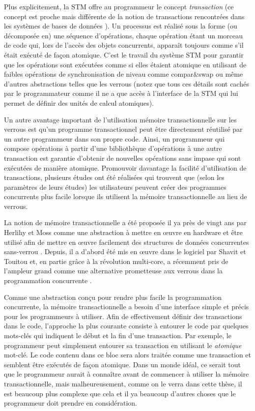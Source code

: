 Plus explicitement, la STM offre au programmeur le concept {\it transaction} (ce concept est proche mais différente
de la notion de transactions rencontrées dans les systèmes de bases de données \cite{FFGH08, HCUAGSV07, HL08}).
Un processus est réalisé sous la forme (ou décomposée en) une séquence d'opérations,
chaque opération étant un morceau de code qui, lors de l'accès des objets concurrents, apparaît toujours comme s'il était exécuté de façon atomique.
C'est le travail du système STM pour garantir que les opérations sont exécutées comme
si elles étaient atomique en utilisant de faibles opérations de synchronisation de niveau comme compar\&swap ou même d'autres
abstractions telles que les verrous (notez que tous ces détails sont cachés par le programmateur
comme il ne a que accès à l'interface de la STM qui lui permet de définir des unités de calcul atomiques).


Un autre avantage important de l'utilisation mémoire transactionnelle sur les verrous est 
qu'un programme transactionnel peut être directement réutilisé par un autre programmeur dans son propre code.
Ainsi, un programmeur qui compose opérations à partir d'une bibliothèque d'opérations à une 
autre transaction est garantie d'obtenir de nouvelles opérations sans impase qui sont exécutées de manière atomique.
Promouvoir davantage la facilité d'utilisation de transactions, plusieurs études \cite{PA11, RHW10} ont été réalisées qui
trouvent que (selon les paramètres de leurs études) les utilisateurs peuvent créer des programmes concurrents plus facile 
lorsque ils utilisent la mémoire transactionnelle au lieu de verrous.


La notion de mémoire transactionnelle a été proposée il ya près de vingt ans par Herlihy et Moss comme une abstraction à mettre
en œuvre en hardware et être utilisé afin de mettre en œuvre facilement des structures de données concurrentes sans-verrou \cite{HM93}.
Depuis, il a d'abord été mis en œuvre dans le logiciel par Shavit et Touitou \cite{ST97} et, en partie grâce à la
révolution multi-core, a récemment pris de l'ampleur grand comme une alternative prometteuse aux verrous dans la programmation concurrente \cite{FFGH08,HCUAGSV07,LK08,R08}.


Comme une abstraction conçu pour rendre plus facile la programmation concurrente, la mémoire transactionnelle a
besoin d'une interface simple et précis pour les programmeurs à utiliser.
Afin de effectivement définir des transactions dans le code,
l'approche la plus courante consiste à entourer le code par quelques mots-clés qui indiquent le début et la fin d'une transaction.
Par exemple, le programmeur peut simplement entourer sa transaction en utilisant le \emph{atomique} mot-clé.
Le code contenu dans ce bloc sera alors traitée comme une transaction et semblent être exécutés de façon atomique.
Dans un monde idéal, ce serait tout que le programmeur aurait à connaître avant de commencer à utiliser la mémoire transactionnelle,
mais malheureusement, comme on le verra dans cette thèse, il est beaucoup plus complexe que cela et il ya beaucoup d'autres choses que le programmeur doit prendre en considération.



